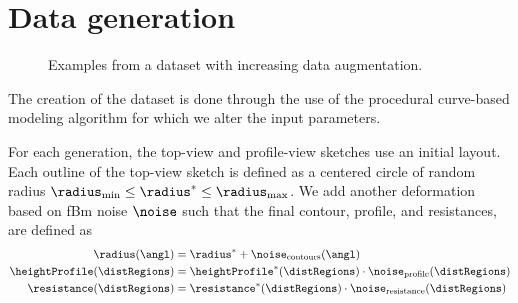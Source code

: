 \section{Data generation}
\label{sec:coral-island_dataset-generation}



\begin{figure}[b]
	\centering
    \caption{Examples from a dataset with increasing data augmentation.}
    \label{fig:coral-island_cGAN-examples}
\end{figure}


The creation of the dataset is done through the use of the procedural curve-based modeling algorithm for which we alter the input parameters. 

For each generation, the top-view and profile-view sketches use an initial layout. Each outline of the top-view sketch is defined as a centered circle of random radius $\radius_\text{min} \leq \radius^* \leq \radius_\text{max}$. We add another deformation based on fBm noise $\noise$ such that the final contour, profile, and resistances, are defined as 
\begin{align}
    \radius(\angl) &= \radius^* + \noise_{\text{contours}}(\angl) \nonumber \\
    \heightProfile(\distRegions) &= \heightProfile^*(\distRegions) \cdot \noise_{\text{profile}}(\distRegions) \nonumber \\
    \resistance(\distRegions) &= \resistance^*(\distRegions) \cdot \noise_{\text{resistance}}(\distRegions) \nonumber
\end{align}


